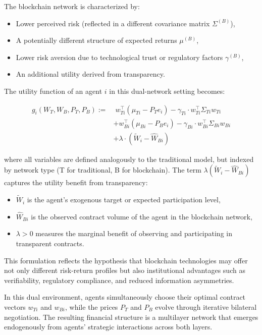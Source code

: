 The blockchain network is characterized by:
\begin{itemize}
    \item Lower perceived risk (reflected in a different covariance matrix \( \Sigma^{(B)} \)),
    \item A potentially different structure of expected returns \( \mu^{(B)} \),
    \item Lower risk aversion due to technological trust or regulatory factors \( \gamma^{(B)} \),
    \item An additional utility derived from transparency.
\end{itemize}

The utility function of an agent \( i \) in this dual-network setting becomes:

\begin{align*}
g_i(W_T, W_B, P_T, P_B) := &\; w_{Ti}^\top (\mu_{Ti} - P_T e_i) - \gamma_{Ti} \cdot w_{Ti}^\top \Sigma_{Ti} w_{Ti} \\
&+ w_{Bi}^\top (\mu_{Bi} - P_B e_i) - \gamma_{Bi} \cdot w_{Bi}^\top \Sigma_{Bi} w_{Bi} \\
&+ \lambda \cdot (\tilde{W}_i - \hat{W}_{Bi})
\end{align*}

\noindent where all variables are defined analogously to the traditional model, but indexed by network type (T for traditional, B for blockchain). The term \( \lambda (\tilde{W}_i - \hat{W}_{Bi}) \) captures the utility benefit from transparency:

\begin{itemize}
    \item \( \tilde{W}_i \) is the agent's exogenous target or expected participation level,
    \item \( \hat{W}_{Bi} \) is the observed contract volume of the agent in the blockchain network,
    \item \( \lambda > 0 \) measures the marginal benefit of observing and participating in transparent contracts.
\end{itemize}

This formulation reflects the hypothesis that blockchain technologies may offer not only different risk-return profiles but also institutional advantages such as verifiability, regulatory compliance, and reduced information asymmetries.

In this dual environment, agents simultaneously choose their optimal contract vectors \( w_{Ti} \) and \( w_{Bi} \), while the prices \( P_T \) and \( P_B \) evolve through iterative bilateral negotiation. The resulting financial structure is a multilayer network that emerges endogenously from agents' strategic interactions across both layers.

